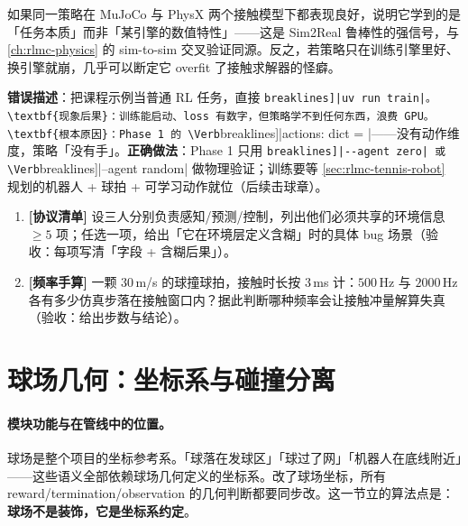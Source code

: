 \begin{insight}[双引擎都跑得好 = 策略学到了任务本质]\label{ins:rlmc-tennis-sim2sim}
如果同一策略在 MuJoCo 与 PhysX 两个接触模型下都表现良好，说明它学到的是「任务本质」而非「某引擎的数值特性」——这是 Sim2Real 鲁棒性的强信号，与 \cref{ch:rlmc-physics} 的 sim-to-sim 交叉验证同源。反之，若策略只在训练引擎里好、换引擎就崩，几乎可以断定它 overfit 了接触求解器的怪癖。
\end{insight}

\begin{pitfall}
\textbf{错误描述}：把课程示例当普通 RL 任务，直接 \Verb[breaklines]|uv run train|。\textbf{现象后果}：训练能启动、loss 有数字，但策略学不到任何东西，浪费 GPU。\textbf{根本原因}：Phase 1 的 \Verb[breaklines]|actions: dict = {}|——没有动作维度，策略「没有手」。\textbf{正确做法}：Phase 1 只用 \Verb[breaklines]|--agent zero| 或 \Verb[breaklines]|--agent random| 做物理验证；训练要等 \cref{sec:rlmc-tennis-robot} 规划的机器人 + 球拍 + 可学习动作就位（后续击球章）。
\end{pitfall}

\begin{practice}[本节动手任务]
\begin{enumerate}
  \item \textbf{[协议清单]} 设三人分别负责感知/预测/控制，列出他们必须共享的环境信息 $\ge 5$ 项；任选一项，给出「它在环境层定义含糊」时的具体 bug 场景（验收：每项写清「字段 + 含糊后果」）。
  \item \textbf{[频率手算]} 一颗 $30$\,m/s 的球撞球拍，接触时长按 $3$\,ms 计：$500$\,Hz 与 $2000$\,Hz 各有多少仿真步落在接触窗口内？据此判断哪种频率会让接触冲量解算失真（验收：给出步数与结论）。
\end{enumerate}
\end{practice}

\section{球场几何：坐标系与碰撞分离}
\label{sec:rlmc-tennis-court}

\paragraph{模块功能与在管线中的位置。}球场是整个项目的坐标参考系。「球落在发球区」「球过了网」「机器人在底线附近」——这些语义全部依赖球场几何定义的坐标系。改了球场坐标，所有 reward/termination/observation 的几何判断都要同步改。这一节立的算法点是：\textbf{球场不是装饰，它是坐标系约定}。

